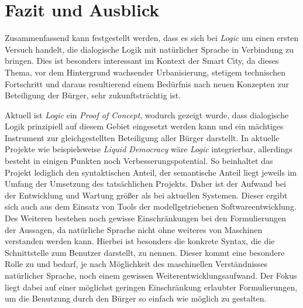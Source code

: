 \documentclass[11pt,a4paper,bibtotocnumbered]{scrreprt}
\begin{document}
\chapter{Fazit und Ausblick} %
Zusammenfassend kann festgestellt werden, dass es sich bei \textit{Logic} um einen ersten Versuch handelt, die dialogische Logik mit natürlicher Sprache in Verbindung zu bringen.
Dies ist besonders interessant im Kontext der Smart City, da dieses Thema, vor dem Hintergrund wachsender Urbanisierung, stetigem technischen Fortschritt und daraus resultierend einem Bedürfnis nach neuen Konzepten zur Beteiligung der Bürger, sehr zukunftsträchtig ist.

Aktuell ist \textit{Logic}  ein \textit{Proof of Concept}, wodurch gezeigt wurde, dass dialogische Logik prinzipiell auf diesem Gebiet eingesetzt werden kann und ein mächtiges Instrument zur gleichgestellten Beteiligung aller Bürger darstellt.
In aktuelle Projekte wie beispielsweise \textit{Liquid Democracy} wäre \textit{Logic} integrierbar, allerdings besteht in einigen Punkten noch Verbesserungspotential.
So beinhaltet das Projekt lediglich den syntaktischen Anteil, der semantische Anteil liegt jeweils im Umfang der Umsetzung des tatsächlichen Projekts. Daher ist der Aufwand bei der Entwicklung und Wartung größer als bei aktuellen Systemen. Dieser ergibt sich auch aus dem Einsatz von Tools der modellgetriebenen Softwareentwicklung.
Des Weiteren bestehen noch gewisse Einschränkungen bei den Formulierungen der Aussagen, da natürliche Sprache nicht ohne weiteres von Maschinen verstanden werden kann. Hierbei ist besonders die konkrete Syntax, die die Schnittstelle zum Benutzer darstellt, zu nennen. Dieser kommt eine besondere Rolle zu und bedarf, je nach Möglichkeit des maschinellen Verständnisses natürlicher Sprache, noch einem gewissen Weiterentwicklungsaufwand. Der Fokus liegt dabei auf einer möglichst geringen Einschränkung erlaubter Formulierungen, um die Benutzung durch den Bürger so einfach wie möglich zu gestalten.
\end{document}
